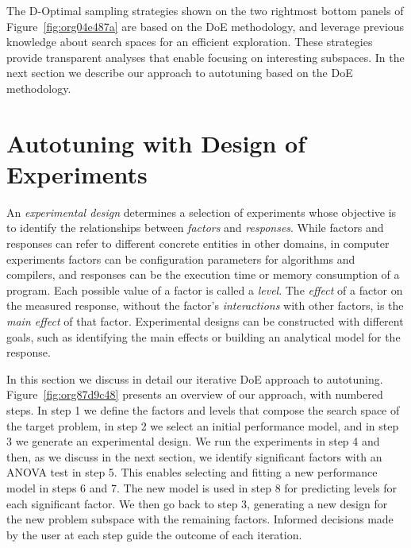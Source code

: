 \documentclass[conference]{IEEEtran}
\begin{document}
The D-Optimal sampling strategies shown on the two rightmost bottom panels of
Figure~\ref{fig:org04e487a} are based on the DoE methodology, and
leverage previous knowledge about search spaces for an efficient exploration.
These strategies provide transparent analyses that enable focusing on
interesting subspaces. In the next section we describe our approach to
autotuning based on the DoE methodology.
\section{Autotuning with Design of Experiments}
\label{sec:org0451712}
An \emph{experimental design} determines a selection of experiments whose objective
is to identify the relationships between \emph{factors} and \emph{responses}. While
factors and responses can refer to different concrete entities in other domains,
in computer experiments factors can be configuration parameters for algorithms
and compilers, and responses can be the execution time or memory consumption of
a program. Each possible value of a factor is called a \emph{level}. The \emph{effect} of
a factor on the measured response, without the factor's \emph{interactions} with
other factors, is the \emph{main effect} of that factor. Experimental designs can be
constructed with different goals, such as identifying the main effects or
building an analytical model for the response.

In this section we discuss in detail our iterative DoE approach to autotuning.
Figure~\ref{fig:org87d9c48} presents an overview of our approach, with
numbered steps. In step 1 we define the factors and levels that compose the
search space of the target problem, in step 2 we select an initial performance
model, and in step 3 we generate an experimental design. We run the experiments
in step 4 and then, as we discuss in the next section, we identify significant
factors with an ANOVA test in step 5. This enables selecting and fitting a new
performance model in steps 6 and 7. The new model is used in step 8 for
predicting levels for each significant factor. We then go back to step 3,
generating a new design for the new problem subspace with the remaining factors.
Informed decisions made by the user at each step guide the outcome of each
iteration.
\end{document}
